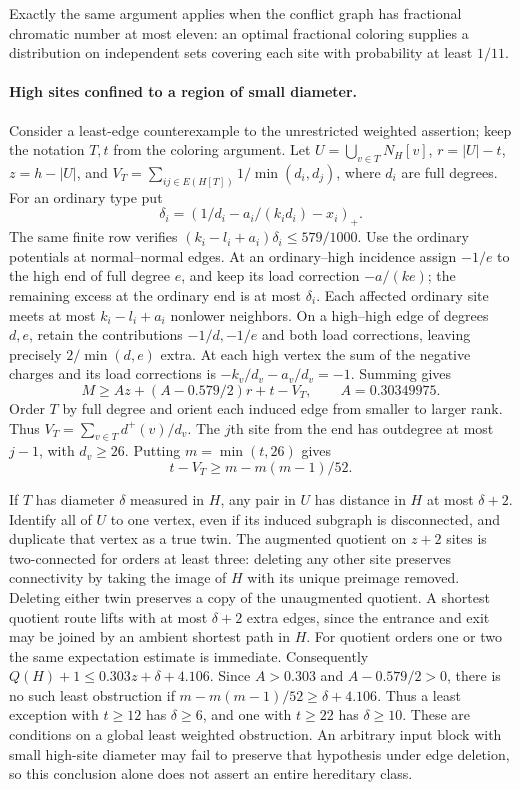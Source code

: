 \documentclass[11pt,a4paper]{article}
\begin{document}
Exactly the same argument applies when the conflict graph has fractional chromatic number at most eleven: an optimal fractional coloring supplies a distribution on independent sets covering each site with probability at least $1/11$.

\paragraph{High sites confined to a region of small diameter.}
Consider a least-edge counterexample to the unrestricted weighted assertion; keep the notation $T,t$ from the coloring argument. Let $U=\bigcup_{v\in T}N_H[v]$, $r=|U|-t$, $z=h-|U|$, and $V_T=\sum_{ij\in E(H[T])}1/\min(d_i,d_j)$, where $d_i$ are full degrees. For an ordinary type put
\[
 \delta_i=(1/d_i-a_i/(k_i d_i)-x_i)_+ .
\]
The same finite row verifies $(k_i-l_i+a_i)\delta_i\le579/1000$. Use the ordinary potentials at normal--normal edges. At an ordinary--high incidence assign $-1/e$ to the high end of full degree $e$, and keep its load correction $-a/(ke)$; the remaining excess at the ordinary end is at most $\delta_i$. Each affected ordinary site meets at most $k_i-l_i+a_i$ nonlower neighbors. On a high--high edge of degrees $d,e$, retain the contributions $-1/d,-1/e$ and both load corrections, leaving precisely $2/\min(d,e)$ extra. At each high vertex the sum of the negative charges and its load corrections is $-k_v/d_v-a_v/d_v=-1$. Summing gives
\[
 M\ge A z+(A-0.579/2)r+t-V_T,\qquad A=0.30349975 .
\]
Order $T$ by full degree and orient each induced edge from smaller to larger rank. Thus $V_T=\sum_{v\in T}d^+(v)/d_v$. The $j$th site from the end has outdegree at most $j-1$, with $d_v\ge26$. Putting $m=\min(t,26)$ gives
\[
 t-V_T\ge m-m(m-1)/52 .
\]

If $T$ has diameter $\delta$ measured in $H$, any pair in $U$ has distance in $H$ at most $\delta+2$. Identify all of $U$ to one vertex, even if its induced subgraph is disconnected, and duplicate that vertex as a true twin. The augmented quotient on $z+2$ sites is two-connected for orders at least three: deleting any other site preserves connectivity by taking the image of $H$ with its unique preimage removed. Deleting either twin preserves a copy of the unaugmented quotient. A shortest quotient route lifts with at most $\delta+2$ extra edges, since the entrance and exit may be joined by an ambient shortest path in $H$. For quotient orders one or two the same expectation estimate is immediate. Consequently $Q(H)+1\le0.303z+\delta+4.106$. Since $A>0.303$ and $A-0.579/2>0$, there is no such least obstruction if $m-m(m-1)/52\ge\delta+4.106$. Thus a least exception with $t\ge12$ has $\delta\ge6$, and one with $t\ge22$ has $\delta\ge10$. These are conditions on a global least weighted obstruction. An arbitrary input block with small high-site diameter may fail to preserve that hypothesis under edge deletion, so this conclusion alone does not assert an entire hereditary class.
\end{document}
